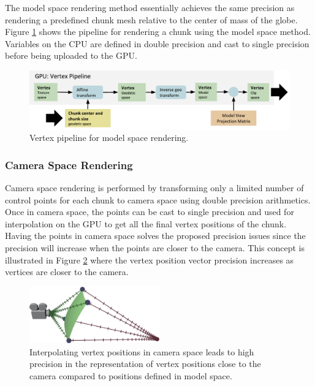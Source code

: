 The model space rendering method essentially achieves the same precision as rendering a predefined chunk mesh relative to the center of mass of the globe. Figure \ref{fig:pipelineglobal} shows the pipeline for rendering a chunk using the model space method. Variables on the CPU are defined in double precision and cast to single precision before being uploaded to the GPU.

\begin{figure}[htbp]
    \centering
    \includegraphics[width=\textwidth]{figures/implementation/rendering/pipeline_global.pdf}
    \caption{Vertex pipeline for model space rendering.}
    \label{fig:pipelineglobal}
\end{figure}

\subsubsection{Camera Space Rendering}

Camera space rendering is performed by transforming only a limited number of control points for each chunk to camera space using double precision arithmetics. Once in camera space, the points can be cast to single precision and used for interpolation on the GPU to get all the final vertex positions of the chunk. Having the points in camera space solves the proposed precision issues since the precision will increase when the points are closer to the camera. This concept is illustrated in Figure \ref{fig:local} where the vertex position vector precision increases as vertices are closer to the camera.

\begin{figure}[htbp]
    \centering
    \includegraphics[width=0.5\textwidth]{figures/implementation/rendering/local.pdf}
    \caption{Interpolating vertex positions in camera space leads to high precision in the representation of vertex positions close to the camera compared to positions defined in model space.}
    \label{fig:local}
\end{figure}

